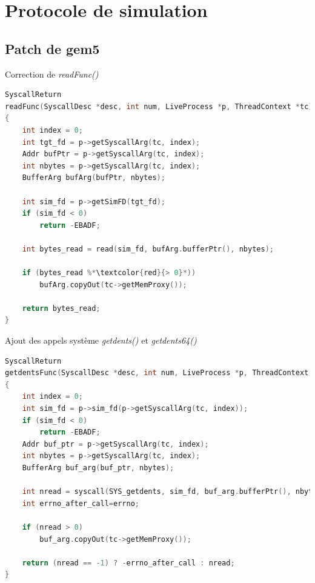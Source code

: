 \documentclass{beamer}
\begin{document}
\section{Protocole de simulation}
\subsection{Patch de gem5}
\begin{frame}[fragile]{Correction de \textit{readFunc()}}
\begin{lstlisting}[language=c++]
SyscallReturn
readFunc(SyscallDesc *desc, int num, LiveProcess *p, ThreadContext *tc)
{
    int index = 0;
    int tgt_fd = p->getSyscallArg(tc, index);
    Addr bufPtr = p->getSyscallArg(tc, index);
    int nbytes = p->getSyscallArg(tc, index);
    BufferArg bufArg(bufPtr, nbytes);

    int sim_fd = p->getSimFD(tgt_fd);
    if (sim_fd < 0)
        return -EBADF;

    int bytes_read = read(sim_fd, bufArg.bufferPtr(), nbytes);

    if (bytes_read %*\textcolor{red}{> 0}*))
        bufArg.copyOut(tc->getMemProxy());

    return bytes_read;
}
\end{lstlisting}
\end{frame}

\begin{frame}[fragile]{Ajout des appels système \textit{getdents()} et \textit{getdents64()}}
\tiny
\begin{lstlisting}[language=c++]
SyscallReturn
getdentsFunc(SyscallDesc *desc, int num, LiveProcess *p, ThreadContext *tc)
{
    int index = 0;
    int sim_fd = p->sim_fd(p->getSyscallArg(tc, index));
    if (sim_fd < 0)
        return -EBADF;
    Addr buf_ptr = p->getSyscallArg(tc, index);
    int nbytes = p->getSyscallArg(tc, index);
    BufferArg buf_arg(buf_ptr, nbytes);

    int nread = syscall(SYS_getdents, sim_fd, buf_arg.bufferPtr(), nbytes);
    int errno_after_call=errno;

    if (nread > 0)
        buf_arg.copyOut(tc->getMemProxy());

    return (nread == -1) ? -errno_after_call : nread;
}
\end{lstlisting}

\end{frame}
\end{document}
